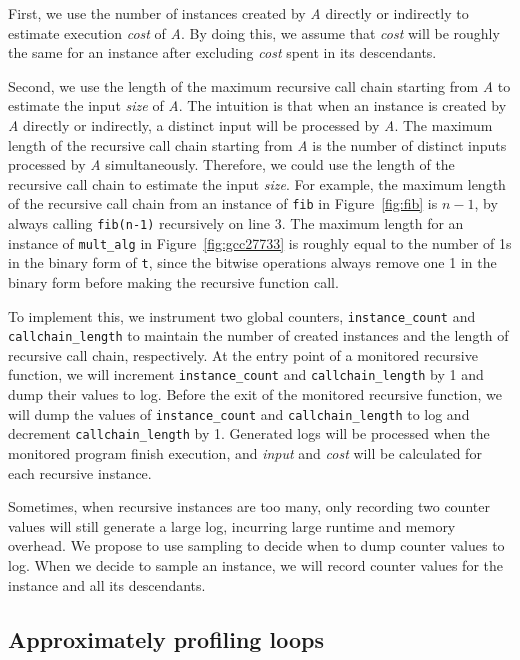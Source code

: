 First, we use the number of instances created by \textit{A} directly or indirectly 
to estimate execution \textit{cost} of \textit{A}.
By doing this, we assume that \textit{cost} 
will be roughly the same for an instance after excluding 
\textit{cost} spent in its descendants.

Second, we use the length of 
the maximum recursive call chain starting from \textit{A} to estimate
the input \textit{size} of \textit{A}. 
The intuition is that 
when an instance is created by \textit{A} directly or indirectly, 
a distinct input will be processed by \textit{A}.
The maximum length of the recursive call chain starting from \textit{A} 
is the number of distinct inputs processed by \textit{A} simultaneously.
Therefore, we could use the length of the recursive call chain 
to estimate the input \textit{size}. 
For example, 
the maximum length of the recursive call chain from an instance of \texttt{fib} 
in Figure~\ref{fig:fib} is $n-1$, 
by always calling \texttt{fib(n-1)} recursively on line 3.
The maximum length for an instance of \texttt{mult\_alg} 
in Figure~\ref{fig:gcc27733} 
is roughly equal to the number of 1s in the binary form of \texttt{t},
since the bitwise operations always remove one 1 in the binary 
form before making the recursive function call.  
  

To implement this, 
we instrument two global counters, 
\texttt{instance\_count} and \texttt{callchain\_length} 
to maintain the number of created instances and 
the length of recursive call chain, respectively. 
At the entry point of a monitored recursive function,
we will increment \texttt{instance\_count} and \texttt{callchain\_length} by 1
and dump their values to log.
Before the exit of the monitored recursive function,
we will dump the values of 
\texttt{instance\_count} and \texttt{callchain\_length} 
to log
and decrement \texttt{callchain\_length} by 1.
Generated logs will be processed when the monitored program finish execution, 
and \textit{input} and \textit{cost} 
will be calculated for each recursive instance.  

Sometimes, when recursive instances are too many, 
only recording two counter values will still generate a large log, 
incurring large runtime and memory overhead. 
We propose to use sampling to decide when to dump counter values to log.
When we decide to sample an instance, 
we will record counter values for the instance and all its descendants. 


\subsection{Approximately profiling loops}

